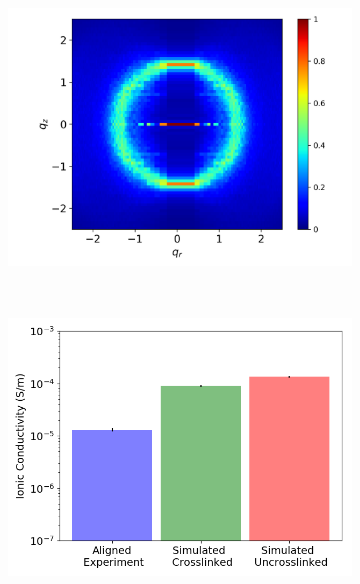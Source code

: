\documentclass{article}
\begin{document}
  \begin{figure}
  \centering
  \begin{subfigure}{0.45\textwidth}
	\centering
	\includegraphics[width=\textwidth]{rzplot_xlink.png}
	\caption{}~\label{fig:rzplot_xlink}
  \end{subfigure}
  \begin{subfigure}{0.45\textwidth}
	\centering
	\includegraphics[width=\textwidth]{IC_xlink.png}
	\caption{}~\label{fig:IC_xlink}
  \end{subfigure}
  \begin{subfigure}{0.45\textwidth}
	\centering

\end{subfigure}
\end{figure}
\end{document}
